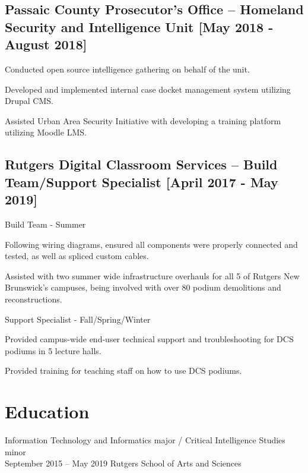\documentclass{article}
\begin{document}
\begin{samepage}
\subsection{Passaic County Prosecutor's Office -- Homeland Security and Intelligence Unit [May 2018 - August 2018]}
\begin{compactitem}
	\item Conducted open source intelligence gathering on behalf of the unit.
	\item Developed and implemented internal case docket management system utilizing Drupal CMS.
	\item Assisted Urban Area Security Initiative with developing a training platform utilizing Moodle LMS.
\end{compactitem}
\subsection{Rutgers Digital Classroom Services -- Build Team/Support Specialist [April 2017 - May 2019]}
\begin{compactitem}
\item Build Team - Summer
	\begin{compactitem}
		\item Following wiring diagrams, ensured all components were properly connected and tested, as well as spliced custom cables.
		\item Assisted with two summer wide infrastructure overhauls for all 5 of Rutgers New Brunswick's campuses, being involved with over 80 podium demolitions and reconstructions.
	\end{compactitem}
\item Support Specialist - Fall/Spring/Winter
	\begin{compactitem}
		\item Provided campus-wide end-user technical support and troubleshooting for DCS podiums in 5 lecture halls.
		\item Provided training for teaching staff on how to use DCS podiums.
	\end{compactitem}
\end{compactitem}

\section{Education}
Information Technology and Informatics major /
Critical Intelligence Studies minor \\
September 2015 -- May 2019
Rutgers School of Arts and Sciences


\end{samepage}
\end{document}
